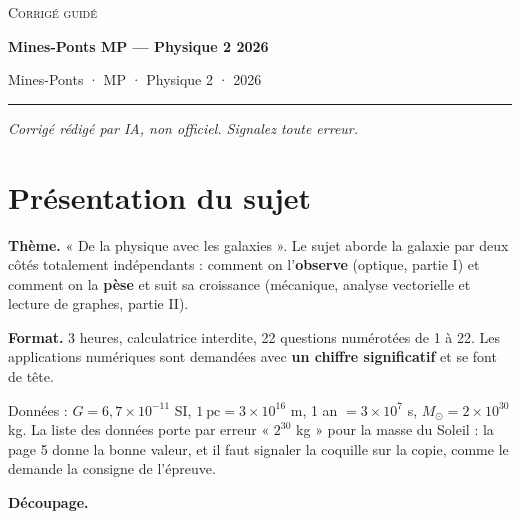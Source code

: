 \documentclass[11pt,a4paper]{article}
\begin{document}
\thispagestyle{plain}
\begin{center}
  {\small\scshape Corrigé guidé}\par\smallskip
  {\LARGE\bfseries Mines-Ponts MP — Physique 2 2026\par}\medskip
  {\large Mines-Ponts · MP · Physique 2 · 2026\par}
\end{center}
\vspace{2pt}\hrule\vspace{8pt}

\emph{Corrigé rédigé par IA, non officiel. Signalez toute erreur.}

\hypertarget{pruxe9sentation-du-sujet}{%
\section{Présentation du sujet}\label{pruxe9sentation-du-sujet}}

\textbf{Thème.} « De la physique avec les galaxies ». Le sujet aborde la galaxie par deux côtés totalement indépendants : comment on l'\textbf{observe} (optique, partie I) et comment on la \textbf{pèse} et suit sa croissance (mécanique, analyse vectorielle et lecture de graphes, partie II).

\textbf{Format.} 3 heures, calculatrice interdite, 22 questions numérotées de 1 à 22. Les applications numériques sont demandées avec \textbf{un chiffre significatif} et se font de tête.

Données : \(G=6{,}7\times10^{-11}\) SI, \(1\ \mathrm{pc}=3\times10^{16}\) m, 1 an \(=3\times10^7\) s, \(M_\odot=2\times10^{30}\) kg. La liste des données porte par erreur « \(2^{30}\) kg » pour la masse du Soleil : la page 5 donne la bonne valeur, et il faut signaler la coquille sur la copie, comme le demande la consigne de l'épreuve.

\textbf{Découpage.}
\end{document}
